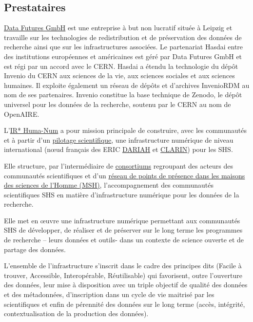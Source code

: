 \subsection*{Prestataires}
\href{https://www.data-futures.org/}{Data Futures GmbH} est une entreprise à but non lucratif située à Leipzig et travaille sur les technologies de redistribution et de préservation des données de recherche ainsi que sur les infrastructures associées. Le partenariat Hasdai entre des institutions européennes et américaines est géré par Data Futures GmbH et est régi par un accord avec le CERN. Hasdai a étendu la technologie du dépôt Invenio du CERN aux sciences de la vie, aux sciences sociales et aux sciences humaines. Il exploite également un réseau de dépôts et d'archives InvenioRDM au nom de ses partenaires. Invenio constitue la base technique de Zenodo, le dépôt universel pour les données de la recherche, soutenu par le CERN au nom de OpenAIRE.

L’\href{https://www.huma-num.fr/quest-ce-que-l-ir-huma-num/}{IR* Huma-Num} a pour mission principale de construire, avec les communautés et à partir d’un \href{https://www.huma-num.fr/conseils-et-comites/}{pilotage scientifique}, une infrastructure numérique de niveau international (nœud français des ERIC \href{https://www.huma-num.fr/infrastructures-europeennes/#dariah}{DARIAH} et \href{https://www.huma-num.fr/infrastructures-europeennes/#clarin}{CLARIN}) pour les SHS. 

Elle structure, par l’intermédiaire de \href{https://www.huma-num.fr/les-consortiums-hn/}{consortiums} regroupant des acteurs des communautés scientifiques et d’un \href{https://www.huma-num.fr/trouver-son-relais-msh/}{réseau de points de présence dans les maisons des sciences de l’Homme (MSH)}, l’accompagnement des communautés scientifiques SHS en matière d’infrastructure numérique pour les données de la recherche. 

Elle met en œuvre une infrastructure numérique permettant aux communautés SHS de développer, de réaliser et de préserver sur le long terme les programmes de recherche – leurs données et outils- dans un contexte de science ouverte et de partage des données. 

L’ensemble de l’infrastructure s’inscrit dans le cadre des principes dits \fair (Facile à trouver, Accessible, Interopérable, Réutilisable) qui favorisent, outre l’ouverture des données, leur mise à disposition avec un triple objectif de qualité des données et des métadonnées, d’inscription dans un cycle de vie maitrisé par les scientifiques et enfin de pérennité des données sur le long terme (accès, intégrité, contextualisation de la production des données). 

